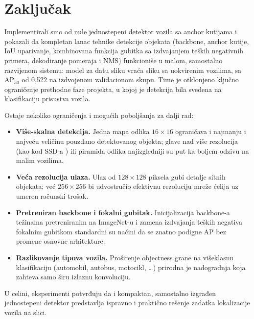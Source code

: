 \documentclass[11pt,a4paper]{article}
\begin{document}
\section{Zaključak}

Implementirali smo od nule jednostepeni detektor vozila sa anchor kutijama i
pokazali da kompletan lanac tehnike detekcije objekata (backbone, anchor
kutije, IoU uparivanje, kombinovana funkcija gubitka sa izdvajanjem teških
negativnih primera, dekodiranje pomeraja i NMS) funkcioniše u malom,
samostalno razvijenom sistemu: model za datu sliku vraća sliku sa uokvirenim
vozilima, sa $\mathrm{AP}_{50}$ od 0,522 na izdvojenom validacionom skupu.
Time je otklonjeno ključno ograničenje prethodne faze projekta, u kojoj je
detekcija bila svedena na klasifikaciju prisustva vozila.

Ostaje nekoliko ograničenja i mogućih poboljšanja za dalji rad:

\begin{itemize}
\item \textbf{Više-skalna detekcija.} Jedna mapa odlika $16\times16$
ograničava i najmanju i najveću veličinu pouzdano detektovanog objekta;
glave nad više rezolucija (kao kod SSD-a \cite{liu2016ssd}) ili piramida
odlika najizgledniji su put ka boljem odzivu na malim vozilima.
\item \textbf{Veća rezolucija ulaza.} Ulaz od $128\times128$ piksela gubi
detalje sitnih objekata; već $256\times256$ bi udvostručio efektivnu
rezoluciju mreže ćelija uz umeren računski trošak.
\item \textbf{Pretreniran backbone i fokalni gubitak.} Inicijalizacija
backbone-a težinama pretreniranim na ImageNet-u i zamena izdvajanja teških
negativa fokalnim gubitkom \cite{lin2017focal} standardni su načini da se
znatno podigne $\mathrm{AP}$ bez promene osnovne arhitekture.
\item \textbf{Razlikovanje tipova vozila.} Proširenje objectness grane na
višeklasnu klasifikaciju (automobil, autobus, motocikl, \ldots) prirodna je
nadogradnja koja zahteva samo širu izlaznu konvoluciju.
\end{itemize}

U celini, eksperimenti potvrđuju da i kompaktan, samostalno izgrađen
jednostepeni detektor predstavlja ispravno i praktično rešenje zadatka
lokalizacije vozila na slici.
\end{document}
